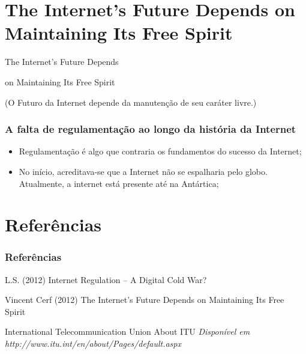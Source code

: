 \documentclass{beamer}
\begin{document}

\section{The Internet's Future Depends on Maintaining Its Free Spirit}


\begin{frame}
\huge{\centerline{The Internet's Future Depends}}
\huge{\centerline{on Maintaining Its Free Spirit}} 
\normalsize{\centerline{(O Futuro da Internet depende da manutenção de seu caráter livre.)}}
\end{frame}


\begin{frame}
\frametitle{A falta de regulamentação ao longo da história da Internet}
\begin{itemize}
\item Regulamentação é algo que contraria os fundamentos do sucesso da Internet;
\item No início, acreditava-se que a Internet não se espalharia pelo globo. Atualmente, a internet está presente até na Antártica;
\end{itemize}
\end{frame}

\section{Referências}

\begin{frame}
\frametitle{Referências}
\footnotesize{
\begin{thebibliography}{99} %

 L.S. (2012)
\newblock Internet Regulation -- A Digital Cold War?

 Vincent Cerf (2012)
\newblock The Internet's Future Depends on Maintaining Its Free Spirit

 International Telecommunication Union
\newblock About ITU
\newblock \emph{Disponível em http://www.itu.int/en/about/Pages/default.aspx}

\end{thebibliography}
}
\end{frame}
\end{document}
